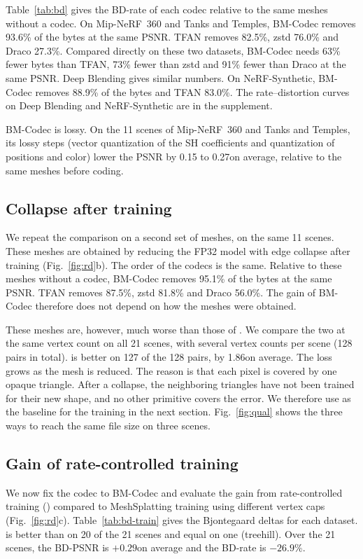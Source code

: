 Table~\ref{tab:bd} gives the BD-rate of each codec relative to the same meshes without a codec. On Mip-NeRF~360 and Tanks and Temples, BM-Codec removes 93.6\% of the bytes at the same PSNR. TFAN removes 82.5\%, zstd 76.0\% and Draco 27.3\%. Compared directly on these two datasets, BM-Codec needs 63\% fewer bytes than TFAN, 73\% fewer than zstd and 91\% fewer than Draco at the same PSNR. Deep Blending gives similar numbers. On NeRF-Synthetic, BM-Codec removes 88.9\% of the bytes and TFAN 83.0\%. The rate--distortion curves on Deep Blending and NeRF-Synthetic are in the supplement.

BM-Codec is lossy. On the 11 scenes of Mip-NeRF~360 and Tanks and Temples, its lossy steps (vector quantization of the SH coefficients and quantization of positions and color) lower the PSNR by 0.15 to 0.27\dB on average, relative to the same meshes before coding.

\subsection{Collapse after training}
\label{sec:simp}
We repeat the comparison on a second set of meshes, on the same 11 scenes. These meshes are obtained by reducing the FP32 model with edge collapse after training (Fig.~\ref{fig:rd}b). The order of the codecs is the same. Relative to these meshes without a codec, BM-Codec removes 95.1\% of the bytes at the same PSNR. TFAN removes 87.5\%, zstd 81.8\% and Draco 56.0\%. The gain of BM-Codec therefore does not depend on how the meshes were obtained.

These meshes are, however, much worse than those of \MSc. We compare the two at the same vertex count on all 21 scenes, with several vertex counts per scene (128 pairs in total). \MSc is better on 127 of the 128 pairs, by 1.86\dB on average. The loss grows as the mesh is reduced. The reason is that each pixel is covered by one opaque triangle. After a collapse, the neighboring triangles have not been trained for their new shape, and no other primitive covers the error. We therefore use \MSc as the baseline for the training in the next section. Fig.~\ref{fig:qual} shows the three ways to reach the same file size on three scenes.

\subsection{Gain of rate-controlled training}
\label{sec:rd}
We now fix the codec to BM-Codec and evaluate the gain from rate-controlled training (\BM) compared to MeshSplatting training using different vertex caps (Fig.~\ref{fig:rd}c). Table~\ref{tab:bd-train} gives the Bjontegaard deltas for each dataset. \BM is better than \MSc on 20 of the 21 scenes and equal on one (treehill). Over the 21 scenes, the BD-PSNR is $+0.29$\dB on average and the BD-rate is $-26.9\%$.

